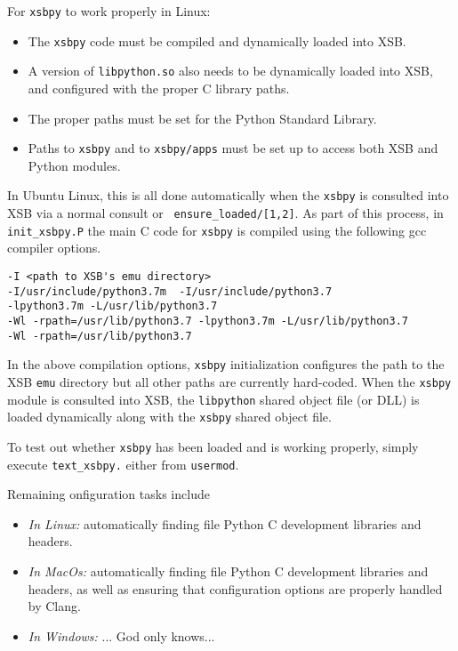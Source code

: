 For {\tt xsbpy} to work properly in Linux:
\begin{itemize}
\item The {\tt xsbpy} code must be compiled and dynamically loaded into XSB.
\item A version of {\tt libpython.so} also needs to be dynamically
  loaded into XSB, and configured with the proper C library paths.
\item The proper paths must be set for the Python Standard Library.
\item Paths to {\tt xsbpy} and to {\tt xsbpy/apps} must be set up to
  access both XSB and Python modules.
\end{itemize}

In Ubuntu Linux, this is all done automatically when the {\tt xsbpy}
is consulted into XSB via a normal consult or {\tt
  ensure\_loaded/[1,2]}.  As part of this process, in {\tt
  init\_xsbpy.P} the main C code for {\tt xsbpy} is compiled using the
following gcc compiler options.  
\begin{verbatim}
-I <path to XSB's emu directory>  
-I/usr/include/python3.7m  -I/usr/include/python3.7  
-lpython3.7m -L/usr/lib/python3.7 
-Wl -rpath=/usr/lib/python3.7 -lpython3.7m -L/usr/lib/python3.7 
-Wl -rpath=/usr/lib/python3.7
\end{verbatim}

\noindent
In the above compilation options, {\tt xsbpy} initialization
configures the path to the XSB {\tt emu} directory but all other paths
are currently hard-coded.
When the {\tt xsbpy} module is
consulted into XSB, the {\tt libpython} shared object file (or DLL) is
loaded dynamically along with the {\tt xsbpy} shared object file.

To test out whether {\tt xsbpy} has been loaded and is working
properly, simply execute {\tt text\_xsbpy.} either from {\tt usermod}.

Remaining onfiguration tasks include

\begin{itemize}
\item {\em In Linux:} automatically finding file Python C development
  libraries and headers.
\item {\em In MacOs:} automatically finding file Python C development
  libraries and headers, as well as ensuring that configuration
  options are properly handled by Clang.
\item {\em In Windows:} ... God only knows...
\end{itemize}

